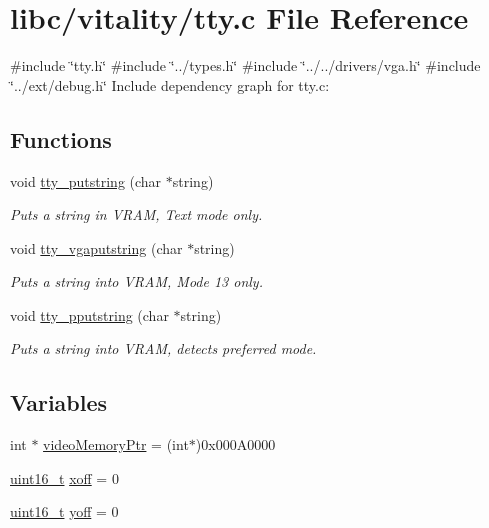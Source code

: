 \hypertarget{a00107}{}\section{libc/vitality/tty.c File Reference}
\label{a00107}
{\ttfamily \#include \char`\"{}tty.\+h\char`\"{}}\newline
{\ttfamily \#include \char`\"{}../types.\+h\char`\"{}}\newline
{\ttfamily \#include \char`\"{}../../drivers/vga.\+h\char`\"{}}\newline
{\ttfamily \#include \char`\"{}../ext/debug.\+h\char`\"{}}\newline
Include dependency graph for tty.\+c\+:
\subsection*{Functions}
\begin{DoxyCompactItemize}
\item 
void \hyperlink{a00107_a2ebb962f457a2677d70285d1c0f9be12_a2ebb962f457a2677d70285d1c0f9be12}{tty\+\_\+putstring} (char $\ast$string)
\begin{DoxyCompactList}\small\item\em Puts a string in V\+R\+AM, Text mode only. \end{DoxyCompactList}\item 
void \hyperlink{a00107_a13ff2c06d56753c5666ca56cb2d81100_a13ff2c06d56753c5666ca56cb2d81100}{tty\+\_\+vgaputstring} (char $\ast$string)
\begin{DoxyCompactList}\small\item\em Puts a string into V\+R\+AM, Mode 13 only. \end{DoxyCompactList}\item 
void \hyperlink{a00107_ade960b1320324706aac6c00cc6b1b2fe_ade960b1320324706aac6c00cc6b1b2fe}{tty\+\_\+pputstring} (char $\ast$string)
\begin{DoxyCompactList}\small\item\em Puts a string into V\+R\+AM, detects preferred mode. \end{DoxyCompactList}\end{DoxyCompactItemize}
\subsection*{Variables}
\begin{DoxyCompactItemize}
\item 
int $\ast$ \hyperlink{a00107_a3f896e9c00b9302e2287aad054199134_a3f896e9c00b9302e2287aad054199134}{video\+Memory\+Ptr} = (int$\ast$)0x000\+A0000
\item 
\hyperlink{a00092_a273cf69d639a59973b6019625df33e30_a273cf69d639a59973b6019625df33e30}{uint16\+\_\+t} \hyperlink{a00107_abaa0d20f0e52ce0d3a7d706f6ac16266_abaa0d20f0e52ce0d3a7d706f6ac16266}{xoff} = 0
\item 
\hyperlink{a00092_a273cf69d639a59973b6019625df33e30_a273cf69d639a59973b6019625df33e30}{uint16\+\_\+t} \hyperlink{a00107_a1a7539764d0ae8cd06ce45c62cf92bca_a1a7539764d0ae8cd06ce45c62cf92bca}{yoff} = 0
\end{DoxyCompactItemize}


